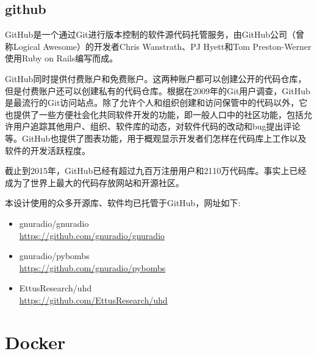 	\subsection{github}
	\par GitHub是一个通过Git进行版本控制的软件源代码托管服务，由GitHub公司（曾称Logical Awesome）的开发者Chris Wanstrath、PJ Hyett和Tom Preston-Werner使用Ruby on Rails编写而成。
	\par GitHub同时提供付费账户和免费账户。这两种账户都可以创建公开的代码仓库，但是付费账户还可以创建私有的代码仓库。根据在2009年的Git用户调查，GitHub是最流行的Git访问站点。除了允许个人和组织创建和访问保管中的代码以外，它也提供了一些方便社会化共同软件开发的功能，即一般人口中的社区功能，包括允许用户追踪其他用户、组织、软件库的动态，对软件代码的改动和bug提出评论等。GitHub也提供了图表功能，用于概观显示开发者们怎样在代码库上工作以及软件的开发活跃程度。
	\par 截止到2015年，GitHub已经有超过九百万注册用户和2110万代码库。事实上已经成为了世界上最大的代码存放网站和开源社区。\cite{ wiki:GitHub}
	\par 本设计使用的众多开源库、软件均已托管于GitHub，网址如下:
	\begin{itemize}
		\item gnuradio/gnuradio\\\href{https://github.com/gnuradio/gnuradio}{https://github.com/gnuradio/gnuradio}
		\item gnuradio/pybombs\\\href{https://github.com/gnuradio/pybombs}{https://github.com/gnuradio/pybombs}
		\item EttusResearch/uhd\\\href{https://github.com/EttusResearch/uhd}{https://github.com/EttusResearch/uhd}
	\end{itemize}
\section{Docker}

